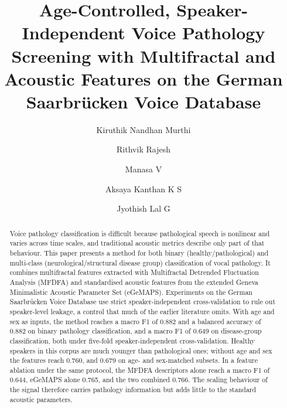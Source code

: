 \documentclass[runningheads]{llncs}
\begin{document}
%
\title{Age-Controlled, Speaker-Independent Voice Pathology Screening with Multifractal and Acoustic Features on the German Saarbr\"ucken Voice Database}
%
%
\author{Kiruthik Nandhan Murthi \and
Rithvik Rajesh \and
Manasa V \and
Aksaya Kanthan K S \and
Jyothish Lal G}
%
%
%
\maketitle            
%
\begin{abstract}
Voice pathology classification is difficult because pathological speech is nonlinear and varies across time scales, and traditional acoustic metrics describe only part of that behaviour. This paper presents a method for both binary (healthy/pathological) and multi-class (neurological/structural disease group) classification of vocal pathology. It combines multifractal features extracted with Multifractal Detrended Fluctuation Analysis (MFDFA) and standardised acoustic features from the extended Geneva Minimalistic Acoustic Parameter Set (eGeMAPS). Experiments on the German Saarbrücken Voice Database use strict speaker-independent cross-validation to rule out speaker-level leakage, a control that much of the earlier literature omits. With age and sex as inputs, the method reaches a macro F1 of 0.882 and a balanced accuracy of 0.882 on binary pathology classification, and a macro F1 of 0.649 on disease-group classification, both under five-fold speaker-independent cross-validation. Healthy speakers in this corpus are much younger than pathological ones; without age and sex the features reach 0.760, and 0.679 on age- and sex-matched subsets. In a feature ablation under the same protocol, the MFDFA descriptors alone reach a macro F1 of 0.644, eGeMAPS alone 0.765, and the two combined 0.766. The scaling behaviour of the signal therefore carries pathology information but adds little to the standard acoustic parameters.

\end{abstract}
%
%
%
\end{document}
